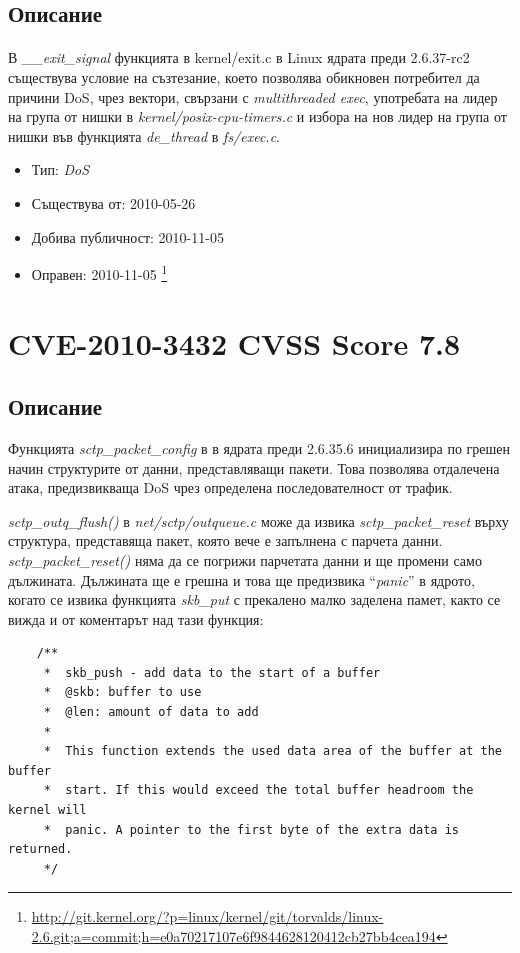\documentclass[a4paper,12pt,leqno]{article}
\begin{document}
\subsection{Описание}
\paragraph{}
В \textit{\_\_exit\_signal} функцията в kernel/exit.c в Linux ядрата преди  2.6.37-rc2 съществува условие на съзтезание, което позволява обикновен потребител да причини DoS, чрез вектори, свързани с \textit{multithreaded exec}, употребата на лидер на група от нишки в \textit{kernel/posix-cpu-timers.c} и избора на нов лидер на група от нишки във функцията \textit{de\_thread} в \textit{fs/exec.c}.

\begin{itemize}
    \item Тип: \textit{DoS}
    \item Съществува от: 2010-05-26
  	\item Добива публичност: 2010-11-05
    \item Оправен: 2010-11-05 \footnote{\url{http://git.kernel.org/?p=linux/kernel/git/torvalds/linux-2.6.git;a=commit;h=e0a70217107e6f9844628120412cb27bb4cea194}}
\end{itemize}

\section{CVE-2010-3432 CVSS Score 7.8} %
\label{sec:CVE-2010-3432 Score 7.8}
\subsection{Описание}
Функцията \textit{sctp\_packet\_config} в  в ядрата преди 2.6.35.6 инициализира по
грешен начин структурите от данни, представляващи пакети. Това позволява отдалечена атака, предизвикваща DoS чрез определена последователност от  трафик.

\textit{sctp\_outq\_flush()} в \textit{net/sctp/outqueue.c}
може да извика \textit{sctp\_packet\_reset} върху
структура, представяща пакет, която вече е запълнена с парчета данни.
\textit{sctp\_packet\_reset()} няма да се погрижи парчетата данни
и ще промени само дължината. Дължината ще е грешна и това ще предизвика
``\textit{panic}'' в ядрото, когато се извика функцията \textit{skb\_put} с
прекалено малко заделена памет, както се вижда и от коментарът над тази функция:
\begin{verbatim}
    /**
     *	skb_push - add data to the start of a buffer
     *	@skb: buffer to use
     *	@len: amount of data to add
     *
     *	This function extends the used data area of the buffer at the buffer
     *	start. If this would exceed the total buffer headroom the kernel will
     *	panic. A pointer to the first byte of the extra data is returned.
     */
\end{verbatim}
\end{document}
